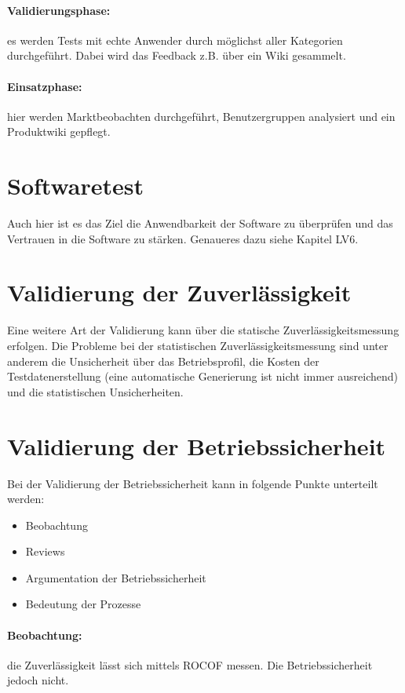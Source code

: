 \paragraph{Validierungsphase: } es werden Tests mit echte Anwender durch möglichst aller Kategorien durchgeführt. Dabei wird das Feedback z.B. über ein Wiki gesammelt. 

\paragraph{Einsatzphase: } hier werden Marktbeobachten durchgeführt, Benutzergruppen analysiert und ein Produktwiki gepflegt.

\section{Softwaretest}
Auch hier ist es das Ziel die Anwendbarkeit der Software zu überprüfen und das Vertrauen in die Software zu stärken. Genaueres dazu siehe Kapitel LV6.

\section{Validierung der Zuverlässigkeit}
Eine weitere Art der Validierung kann über die statische Zuverlässigkeitsmessung erfolgen. 
Die Probleme bei der statistischen Zuverlässigkeitsmessung sind unter anderem die Unsicherheit über das Betriebsprofil, die Kosten der Testdatenerstellung (eine automatische Generierung ist nicht immer ausreichend) und die statistischen Unsicherheiten.

\section{Validierung der Betriebssicherheit}
Bei der Validierung der Betriebssicherheit kann in folgende Punkte unterteilt werden:
\begin{itemize}
\item Beobachtung
\item Reviews
\item Argumentation der Betriebssicherheit
\item Bedeutung der Prozesse
\end{itemize}


\paragraph{Beobachtung:} die Zuverlässigkeit lässt sich mittels ROCOF messen. Die Betriebssicherheit jedoch nicht. 

